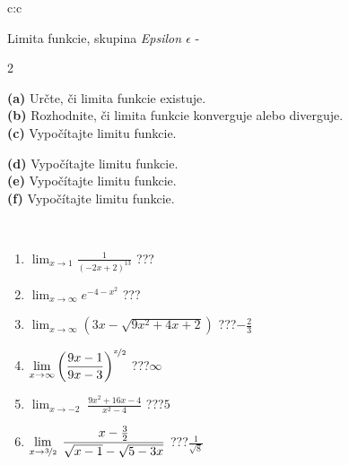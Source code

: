 \documentclass[10pt]{report}
\begin{document}
\newpage
\thispagestyle{empty}
\begin{tabular}{c:c}
\begin{minipage}[c][104.5mm][t]{0.5\linewidth}
\begin{center}
\vspace{7mm}
{\huge Limita funkcie, skupina \textit{Epsilon $\epsilon$} -}\\[5mm]
\begin{minipage}{0.95\linewidth}
\begin{center}
{\small \begin{multicols}{2} \raggedright
\textbf{(a)} Určte, či limita funkcie existuje. \\[1mm]
\textbf{(b)} Rozhodnite, či limita funkcie konverguje alebo diverguje. \\[1mm]
\textbf{(c)} Vypočítajte limitu funkcie. \par \columnbreak
\textbf{(d)} Vypočítajte limitu funkcie. \\[1mm]
\textbf{(e)} Vypočítajte limitu funkcie. \\[1mm]
\textbf{(f)} Vypočítajte limitu funkcie. \\[1mm]
\end{multicols}
}
\end{center}
\end{minipage}
\\[4mm]
\begin{minipage}{0.79\linewidth}
\begin{center}
\begin{varwidth}{\linewidth}
\begin{enumerate}
\normalsize
\item $\displaystyle\lim_{x\to1}{\frac{1}{(-2x+2)^{13}}}$\quad \dotfill\; ???\;\dotfill \quad {}
\item $\displaystyle\lim_{x\to\infty}{e^{-4-x^2}}$\quad \dotfill\; ???\;\dotfill \quad {}
\item $\displaystyle\lim_{x\to\infty}{\left(3x - \sqrt{9x^2+4x+2}\right)}$\quad \dotfill\; ???\;\dotfill \quad $-\frac{2}{3}$
\item $\displaystyle\lim_{x\to\infty}{\left( \frac{9x-1}{9x-3} \right)^{\nicefrac{x}{2}}}$\quad \dotfill\; ???\;\dotfill \quad $\infty$
\item $\displaystyle\lim_{x\to -2}{\;\frac{9x^2+16x-4}{x^2-4}}$\quad \dotfill\; ???\;\dotfill \quad $5$
\item $\displaystyle\lim_{x\to \nicefrac{3}{2}}{\;\frac{x-\frac{3}{2}}{\sqrt{x-1} - \sqrt{5-3x}}}$\quad \dotfill\; ???\;\dotfill \quad $\frac{1}{\sqrt{8}}$

\end{enumerate}
\end{varwidth}
\end{center}
\end{minipage}
\end{center}
\end{minipage}
\end{tabular}
\end{document}
